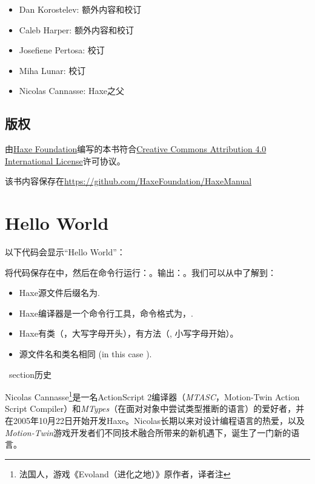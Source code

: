 \begin{itemize}
	\item Dan Korostelev: 额外内容和校订
	\item Caleb Harper: 额外内容和校订
	\item Josefiene Pertosa: 校订
	\item Miha Lunar: 校订
	\item Nicolas Cannasse: Haxe之父
\end{itemize}

\subsection{版权}
\label{introduction-license}

由\href{http://haxe.org/foundation}{Haxe Foundation}编写的本书符合\href{http://creativecommons.org/licenses/by/4.0/}{Creative Commons Attribution 4.0 International License}许可协议。

该书内容保存在\href{https://github.com/HaxeFoundation/HaxeManual}{https://github.com/HaxeFoundation/HaxeManual}

\section{Hello World}
\label{introduction-hello-world}

以下代码会显示``Hello World''：

将代码保存在中，然后在命令行运行：。输出：。我们可以从中了解到：


\begin{itemize}
	\item Haxe源文件后缀名为.
	\item Haxe编译器是一个命令行工具，命令格式为，.
	\item Haxe有类（，大写字母开头），有方法（, 小写字母开始）。
	\item 源文件名和类名相同 (in this case ). 
\end {itemize}
 
\     section{历史 }
\label{introduction-haxe-history}

Nicolas Cannasse\footnote{法国人，游戏《Evoland（进化之地）》原作者，译者注}是一名ActionScript 2编译器（\emph{MTASC}，Motion-Twin Action Script Compiler）和\emph{MTypes}（在面对对象中尝试类型推断的语言）的爱好者，并在2005年10月22日开始开发Haxe。Nicolas长期以来对设计编程语言的热爱，以及\emph{Motion-Twin}游戏开发者们不同技术融合所带来的新机遇下，诞生了一门新的语言。


